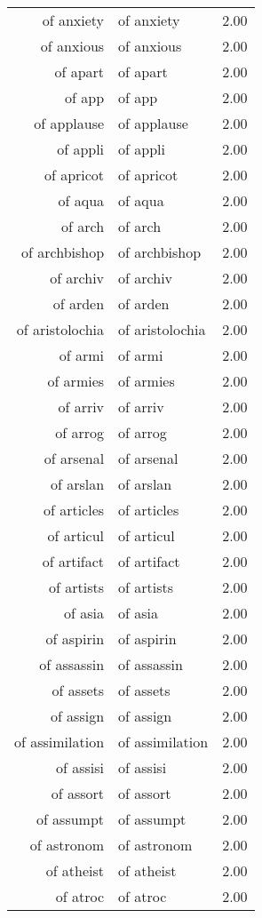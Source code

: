 \begin{table}[ht]
\begin{tabular}{rlr}
  of anxiety & of anxiety & 2.00 \\ 
  of anxious & of anxious & 2.00 \\ 
  of apart & of apart & 2.00 \\ 
  of app & of app & 2.00 \\ 
  of applause & of applause & 2.00 \\ 
  of appli & of appli & 2.00 \\ 
  of apricot & of apricot & 2.00 \\ 
  of aqua & of aqua & 2.00 \\ 
  of arch & of arch & 2.00 \\ 
  of archbishop & of archbishop & 2.00 \\ 
  of archiv & of archiv & 2.00 \\ 
  of arden & of arden & 2.00 \\ 
  of aristolochia & of aristolochia & 2.00 \\ 
  of armi & of armi & 2.00 \\ 
  of armies & of armies & 2.00 \\ 
  of arriv & of arriv & 2.00 \\ 
  of arrog & of arrog & 2.00 \\ 
  of arsenal & of arsenal & 2.00 \\ 
  of arslan & of arslan & 2.00 \\ 
  of articles & of articles & 2.00 \\ 
  of articul & of articul & 2.00 \\ 
  of artifact & of artifact & 2.00 \\ 
  of artists & of artists & 2.00 \\ 
  of asia & of asia & 2.00 \\ 
  of aspirin & of aspirin & 2.00 \\ 
  of assassin & of assassin & 2.00 \\ 
  of assets & of assets & 2.00 \\ 
  of assign & of assign & 2.00 \\ 
  of assimilation & of assimilation & 2.00 \\ 
  of assisi & of assisi & 2.00 \\ 
  of assort & of assort & 2.00 \\ 
  of assumpt & of assumpt & 2.00 \\ 
  of astronom & of astronom & 2.00 \\ 
  of atheist & of atheist & 2.00 \\ 
  of atroc & of atroc & 2.00 \\ 

\end{tabular}
\end{table}
